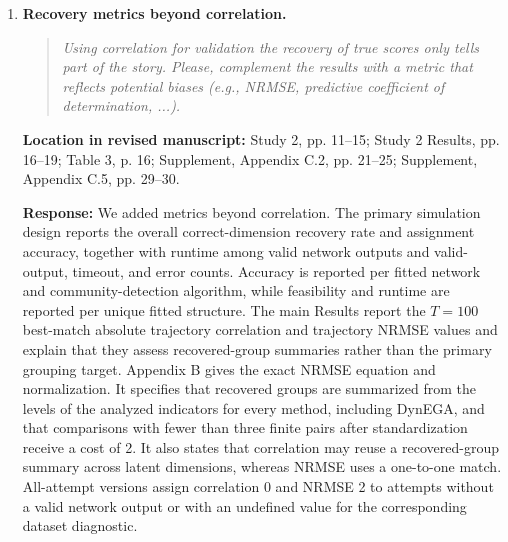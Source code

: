 \documentclass[11pt]{article}
\newenvironment{reviewquote}{\begin{quote}\small\itshape}{\end{quote}}
\newcommand{\point}[1]{\textbf{#1.}}
\newcommand{\location}[1]{\textbf{Location in revised manuscript:} #1\par}
\newcommand{\response}{\textbf{Response:} }
\begin{document}
\begin{enumerate}
  Appendix B lists the family codes, activity gains, and dwell fractions. Table B2 reports the numeric \(\eta\), \(\zeta\), and per-step \(\sigma_q\) vectors used in the final runs. Appendix B also specifies the acceleration-input distribution, Study 1 initial states and activity rule, loading and residual-variance perturbations, switching-dwell draws and rounding, cross-loading scale and truncation, and between-clip baseline and scale distributions. Appendix C reports finite-horizon amplification and stability diagnostics. The Introduction treats classifier scores as fallible measurements of visible expression. Study 1 evaluates selected statistical properties of those scores; it does not estimate emotional trajectories for individual videos.

  \item \point{Recovery metrics beyond correlation}
  \begin{reviewquote}
  Using correlation for validation the recovery of true scores only tells part of the story. Please, complement the results with a metric that reflects potential biases (e.g., NRMSE, predictive coefficient of determination, ...).
  \end{reviewquote}
  \location{Study 2, pp. 11--15; Study 2 Results, pp. 16--19; Table 3, p. 16; Supplement, Appendix C.2, pp. 21--25; Supplement, Appendix C.5, pp. 29--30.}
  \response We added metrics beyond correlation. The primary simulation design reports the overall correct-dimension recovery rate and assignment accuracy, together with runtime among valid network outputs and valid-output, timeout, and error counts. Accuracy is reported per fitted network and community-detection algorithm, while feasibility and runtime are reported per unique fitted structure. The main Results report the $T=100$ best-match absolute trajectory correlation and trajectory NRMSE values and explain that they assess recovered-group summaries rather than the primary grouping target. Appendix B gives the exact NRMSE equation and normalization. It specifies that recovered groups are summarized from the levels of the analyzed indicators for every method, including DynEGA, and that comparisons with fewer than three finite pairs after standardization receive a cost of 2. It also states that correlation may reuse a recovered-group summary across latent dimensions, whereas NRMSE uses a one-to-one match. All-attempt versions assign correlation 0 and NRMSE 2 to attempts without a valid network output or with an undefined value for the corresponding dataset diagnostic.


\end{enumerate}
\end{document}
